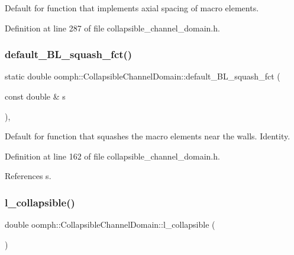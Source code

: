 Default for function that implements axial spacing of macro elements. 



Definition at line 287 of file collapsible\+\_\+channel\+\_\+domain.\+h.

\mbox{\label{classoomph_1_1CollapsibleChannelDomain_a4222184a903df3efdd93cc306bac4414}} 
\subsubsection{\texorpdfstring{default\+\_\+\+B\+L\+\_\+squash\+\_\+fct()}{default\_BL\_squash\_fct()}}
{\footnotesize\ttfamily static double oomph\+::\+Collapsible\+Channel\+Domain\+::default\+\_\+\+B\+L\+\_\+squash\+\_\+fct (\begin{DoxyParamCaption}\item[{const double \&}]{s }\end{DoxyParamCaption})\hspace{0.3cm}{\ttfamily [inline]}, {\ttfamily [static]}}



Default for function that squashes the macro elements near the walls. Identity. 



Definition at line 162 of file collapsible\+\_\+channel\+\_\+domain.\+h.



References s.

\mbox{\label{classoomph_1_1CollapsibleChannelDomain_a0b38028581a27e6b34529ba2c3fa1af2}} 
\subsubsection{\texorpdfstring{l\+\_\+collapsible()}{l\_collapsible()}}
{\footnotesize\ttfamily double oomph\+::\+Collapsible\+Channel\+Domain\+::l\+\_\+collapsible (\begin{DoxyParamCaption}{ }\end{DoxyParamCaption})\hspace{0.3cm}{\ttfamily [inline]}}



